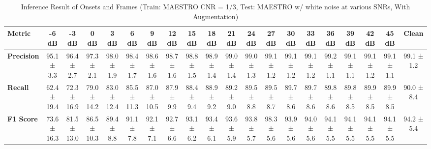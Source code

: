 \documentclass{article}
\begin{document}
\begin{table*}[htbp]
\centering
\caption{Inference Result of Onsets and Frames (Train: MAESTRO CNR = 1/3, Test: MAESTRO w/ white noise at various SNRs, With Augmentation)}
\begin{adjustbox}{max width=\textwidth}
\begin{tabular}{@{}lccccccccccccccccccc@{}}
\toprule
\textbf{Metric} & \textbf{-6 dB} & \textbf{-3 dB} & \textbf{0 dB} & \textbf{3 dB} & \textbf{6 dB} & \textbf{9 dB} & \textbf{12 dB} & \textbf{15 dB} & \textbf{18 dB} & \textbf{21 dB} & \textbf{24 dB} & \textbf{27 dB} & \textbf{30 dB} & \textbf{33 dB} & \textbf{36 dB} & \textbf{39 dB} & \textbf{42 dB} & \textbf{45 dB} & \textbf{Clean} \\ 
\midrule
\textbf{Precision} & 95.1 ± 3.3 & 96.4 ± 2.7 & 97.3 ± 2.1 & 98.0 ± 1.9 & 98.4 ± 1.7 & 98.6 ± 1.6 & 98.7 ± 1.6 & 98.8 ± 1.5 & 98.9 ± 1.4 & 99.0 ± 1.4 & 99.0 ± 1.3 & 99.1 ± 1.2 & 99.1 ± 1.2 & 99.1 ± 1.2 & 99.2 ± 1.1 & 99.1 ± 1.1 & 99.1 ± 1.2 & 99.1 ± 1.1 & 99.1 ± 1.2 \\
\textbf{Recall}    & 62.4 ± 19.4 & 72.3 ± 16.9 & 79.0 ± 14.2 & 83.0 ± 12.4 & 85.5 ± 11.3 & 87.0 ± 10.5 & 87.9 ± 9.9 & 88.4 ± 9.4 & 88.9 ± 9.2 & 89.2 ± 9.0 & 89.5 ± 8.8 & 89.5 ± 8.7 & 89.7 ± 8.6 & 89.7 ± 8.6 & 89.8 ± 8.6 & 89.8 ± 8.5 & 89.9 ± 8.5 & 89.9 ± 8.5 & 90.0 ± 8.4 \\
\textbf{F1 Score}  & 73.6 ± 16.3 & 81.5 ± 13.0 & 86.5 ± 10.3 & 89.4 ± 8.8 & 91.1 ± 7.8 & 92.1 ± 7.1 & 92.7 ± 6.6 & 93.1 ± 6.2 & 93.4 ± 6.1 & 93.6 ± 5.9 & 93.8 ± 5.7 & 98.3 ± 5.6 & 93.9 ± 5.6 & 94.0 ± 5.6 & 94.1 ± 5.5 & 94.1 ± 5.5 & 94.1 ± 5.5 & 94.1 ± 5.5 & 94.2 ± 5.4 \\
\bottomrule
\end{tabular}
\end{adjustbox}
\end{table*}
\end{document}
